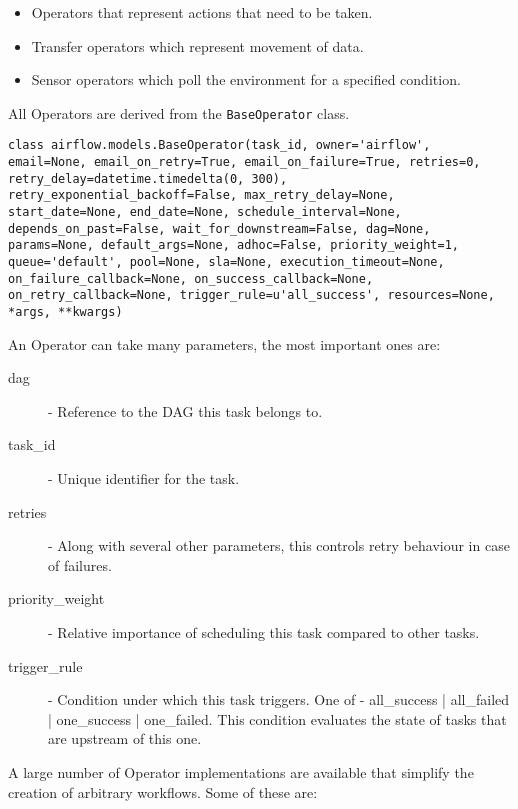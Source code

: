 \begin{itemize}
\item Operators that represent actions that need to be taken.
\item Transfer operators which represent movement of data.
\item Sensor operators which poll the environment for a specified condition.
\end{itemize} 

All Operators are derived from the \texttt{BaseOperator} class.

\begin{verbatim}
class airflow.models.BaseOperator(task_id, owner='airflow', email=None, email_on_retry=True, email_on_failure=True, retries=0, retry_delay=datetime.timedelta(0, 300), retry_exponential_backoff=False, max_retry_delay=None, start_date=None, end_date=None, schedule_interval=None, depends_on_past=False, wait_for_downstream=False, dag=None, params=None, default_args=None, adhoc=False, priority_weight=1, queue='default', pool=None, sla=None, execution_timeout=None, on_failure_callback=None, on_success_callback=None, on_retry_callback=None, trigger_rule=u'all_success', resources=None, *args, **kwargs)
\end{verbatim}

An Operator can take many parameters, the most important ones are:

\begin{description}
\item [dag] - Reference to the DAG this task belongs to.
\item [task\_id] - Unique identifier for the task.
\item [retries] - Along with several other parameters, this controls retry behaviour in case of failures.
\item [priority\_weight] - Relative importance of scheduling this task compared to other tasks.
\item [trigger\_rule] - Condition under which this task triggers. One of - all\_success | all\_failed | one\_success | one\_failed. This condition evaluates the state of tasks that are upstream of this one.
\end{description}

A large number of Operator implementations are available that simplify the creation of arbitrary workflows. Some of these are:

